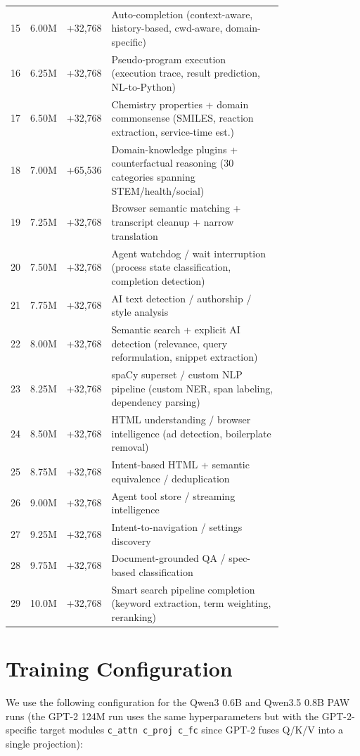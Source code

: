 \begin{table}[!h]
\begin{tabular}{@{}rlr>{\raggedright\arraybackslash}p{0.77\linewidth}@{}}
15 & 6.00M & +32{,}768 & Auto-completion (context-aware, history-based, cwd-aware, domain-specific) \\
16 & 6.25M & +32{,}768 & Pseudo-program execution (execution trace, result prediction, NL-to-Python) \\
17 & 6.50M & +32{,}768 & Chemistry properties + domain commonsense (SMILES, reaction extraction, service-time est.) \\
18 & 7.00M & +65{,}536 & Domain-knowledge plugins + counterfactual reasoning (30 categories spanning STEM/health/social) \\
19 & 7.25M & +32{,}768 & Browser semantic matching + transcript cleanup + narrow translation \\
20 & 7.50M & +32{,}768 & Agent watchdog / wait interruption (process state classification, completion detection) \\
21 & 7.75M & +32{,}768 & AI text detection / authorship / style analysis \\
22 & 8.00M & +32{,}768 & Semantic search + explicit AI detection (relevance, query reformulation, snippet extraction) \\
23 & 8.25M & +32{,}768 & spaCy superset / custom NLP pipeline (custom NER, span labeling, dependency parsing) \\
24 & 8.50M & +32{,}768 & HTML understanding / browser intelligence (ad detection, boilerplate removal) \\
25 & 8.75M & +32{,}768 & Intent-based HTML + semantic equivalence / deduplication \\
26 & 9.00M & +32{,}768 & Agent tool store / streaming intelligence \\
27 & 9.25M & +32{,}768 & Intent-to-navigation / settings discovery \\
28 & 9.75M & +32{,}768 & Document-grounded QA / spec-based classification \\
29 & 10.0M & +32{,}768 & Smart search pipeline completion (keyword extraction, term weighting, reranking) \\
\bottomrule
\end{tabular}
\end{table}


\section{Training Configuration}
\label{appendix:training_details}

We use the following configuration for the Qwen3 0.6B and Qwen3.5 0.8B PAW runs (the GPT-2 124M run uses the same hyperparameters but with the GPT-2-specific target modules \texttt{c\_attn c\_proj c\_fc} since GPT-2 fuses Q/K/V into a single projection):

